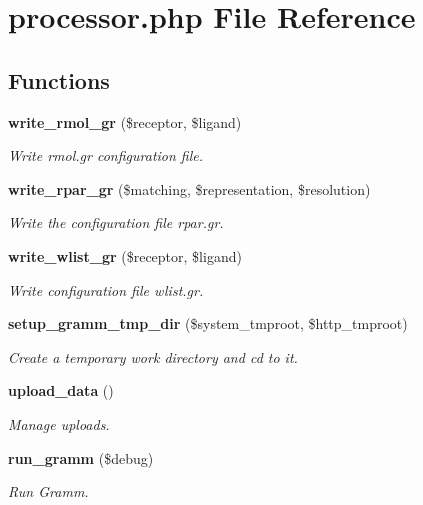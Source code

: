 \section{processor.php File Reference}
\label{processor_8php}
\subsection*{Functions}
\begin{CompactItemize}
\item 
{\bf write\_\-rmol\_\-gr} (\$receptor, \$ligand)
\begin{CompactList}\small\item\em Write rmol.gr configuration file. \item\end{CompactList}\item 
{\bf write\_\-rpar\_\-gr} (\$matching, \$representation, \$resolution)
\begin{CompactList}\small\item\em Write the configuration file rpar.gr. \item\end{CompactList}\item 
{\bf write\_\-wlist\_\-gr} (\$receptor, \$ligand)
\begin{CompactList}\small\item\em Write configuration file wlist.gr. \item\end{CompactList}\item 
{\bf setup\_\-gramm\_\-tmp\_\-dir} (\$system\_\-tmproot, \$http\_\-tmproot)
\begin{CompactList}\small\item\em Create a temporary work directory and cd to it. \item\end{CompactList}\item 
{\bf upload\_\-data} ()
\begin{CompactList}\small\item\em Manage uploads. \item\end{CompactList}\item 
{\bf run\_\-gramm} (\$debug)
\begin{CompactList}\small\item\em Run Gramm. \item\end{CompactList}\end{CompactItemize}
